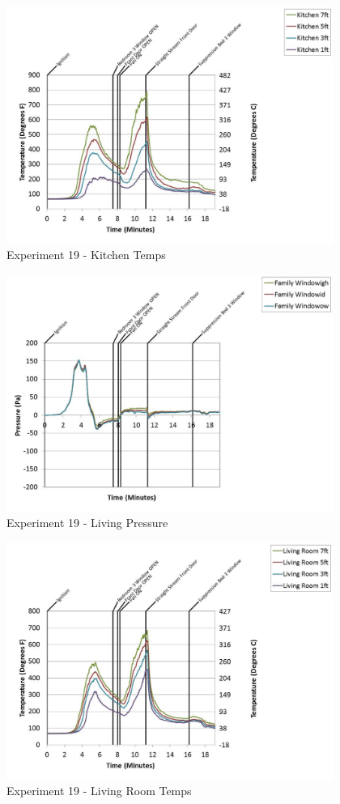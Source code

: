 \documentclass{article}
\begin{document}
\begin{appendices}
	\begin{figure}[h!]
		\centering
		\includegraphics[height=3.05in]{0_Images/Results_Charts/Exp_19_Charts/KitchenTemps.pdf}
		\caption{Experiment 19 - Kitchen Temps}
	\end{figure}
 
	\clearpage

	\begin{figure}[h!]
		\centering
		\includegraphics[height=3.05in]{0_Images/Results_Charts/Exp_19_Charts/LivingPressure.pdf}
		\caption{Experiment 19 - Living Pressure}
	\end{figure}
 

	\begin{figure}[h!]
		\centering
		\includegraphics[height=3.05in]{0_Images/Results_Charts/Exp_19_Charts/LivingRoomTemps.pdf}
		\caption{Experiment 19 - Living Room Temps}
	\end{figure}
 

\end{appendices}
\end{document}
